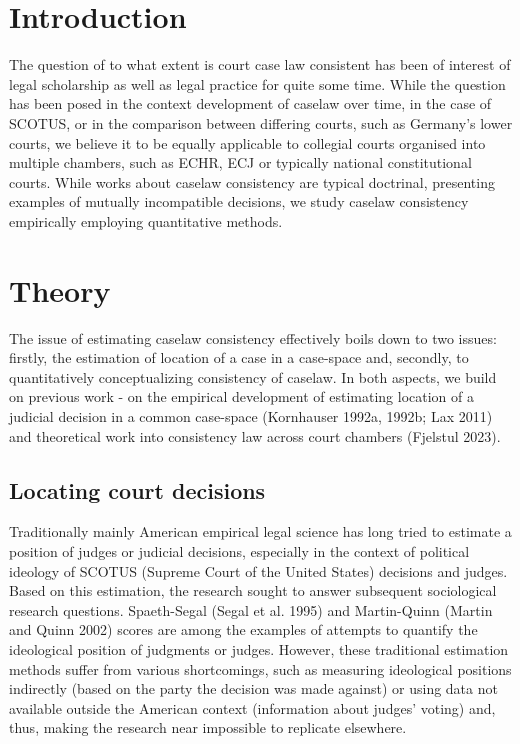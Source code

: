 \documentclass[
  11pt,
]{article}
\begin{document}
\setlength{\parindent}{16pt}
\setlength{\parskip}{0pt}

\doublespacing
\hypertarget{introduction}{%
\section{Introduction}\label{introduction}}

The question of to what extent is court case law consistent has been of
interest of legal scholarship as well as legal practice for quite some
time. While the question has been posed in the context development of
caselaw over time, in the case of SCOTUS, or in the comparison between
differing courts, such as Germany's lower courts, we believe it to be
equally applicable to collegial courts organised into multiple chambers,
such as ECHR, ECJ or typically national constitutional courts. While
works about caselaw consistency are typical doctrinal, presenting
examples of mutually incompatible decisions, we study caselaw
consistency empirically employing quantitative methods.

\hypertarget{theory}{%
\section{Theory}\label{theory}}

The issue of estimating caselaw consistency effectively boils down to
two issues: firstly, the estimation of location of a case in a
case-space and, secondly, to quantitatively conceptualizing consistency
of caselaw. In both aspects, we build on previous work - on the
empirical development of estimating location of a judicial decision in a
common case-space (Kornhauser 1992a, 1992b; Lax 2011) and theoretical
work into consistency law across court chambers (Fjelstul 2023).

\hypertarget{locating-court-decisions}{%
\subsection{Locating court decisions}\label{locating-court-decisions}}

Traditionally mainly American empirical legal science has long tried to
estimate a position of judges or judicial decisions, especially in the
context of political ideology of SCOTUS (Supreme Court of the United
States) decisions and judges. Based on this estimation, the research
sought to answer subsequent sociological research questions.
Spaeth-Segal (Segal et al. 1995) and Martin-Quinn (Martin and Quinn
2002) scores are among the examples of attempts to quantify the
ideological position of judgments or judges. However, these traditional
estimation methods suffer from various shortcomings, such as measuring
ideological positions indirectly (based on the party the decision was
made against) or using data not available outside the American context
(information about judges' voting) and, thus, making the research near
impossible to replicate elsewhere.
\end{document}
